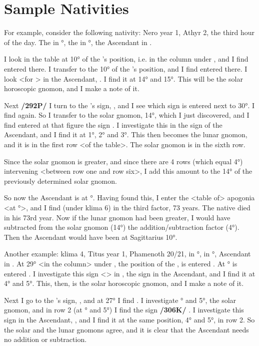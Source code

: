 \section{Sample Nativities}

For example, consider the following nativity: Nero year 1, Athyr 2, the third hour of the day. The \Sun\xspace in \Scorpio\xspace 10°, the \Moon\xspace in \Aquarius\xspace 30°, the Ascendant in \Sagittarius.

I look in the table at 10° of the \Sun’s position, i.e. in the column under \Scorpio, and I find \Pisces\xspace entered there. I transfer to \Pisces\xspace the 10° of the \Sun’s position, and I find \Libra\xspace entered there. I look <for \Libra> in the Ascendant, \Sagittarius.
I find it at 14° and 15°. This will be the solar horoscopic gnomon, and I make a note of it. 

Next \textbf{/292P/} I turn to the \Moon’s sign, \Aquarius, and I see which sign is entered next to 30°. I find \Aquarius\xspace again. So
I transfer to \Aquarius\xspace the solar gnomon, 14°, which I just discovered, and I find entered at that figure the sign \Sagittarius. I investigate this in the sign of the Ascendant, and I find it at 1°, 2° and 3°. This then becomes the lunar gnomon, and it is in the first row <of the table>. The solar gnomon is in the sixth row.

Since the solar gnomon is greater, and since there are 4 rows (which equal 4°) intervening <between row one and row six>, I add this amount to the 14° of the previously determined solar gnomon. 

So now the Ascendant is at \Sagittarius\xspace 18°. Having found this, I enter the <table of> apogonia <at \Sagittarius\xspace 18°>, and I find (under klima 6) in the third factor, 73 years. The native died in his 73rd year. Now if the lunar gnomon had been greater, I would have subtracted from the solar gnomon (14°) the addition/subtraction factor (4°). Then the Ascendant would have been at Sagittarius 10°.

Another example: klima 4, Titus year 1, Phamenoth 20/21, \Sun\xspace in \Pisces\xspace 29°, \Moon\xspace in \Capricorn\xspace 27°, Ascendant in \Scorpio. At 29° <in the column> under \Pisces, the position of the \Sun, is entered
\Cancer. At \Cancer\xspace 29° is entered \Capricorn. I investigate this sign <\Capricorn> in \Scorpio, the sign in the Ascendant, and I find it at 4° and 5°. This, then, is the solar horoscopic gnomon, and I make a note of it. 

Next I go to the \Moon’s sign, \Capricorn, and at 27° I find \Aries. I investigate \Aries\xspace 4° and 5°, the solar gnomon, and in row 2 (at \Aries\xspace 4° and 5°) I find the sign \textbf{/306K/} \Capricorn. I investigate this sign in the Ascendant, \Scorpio, and I find it at the same position, 4° and 5°, in row 2. So the solar and the lunar gnomons agree, and it is clear that the Ascendant needs no addition or subtraction. 

